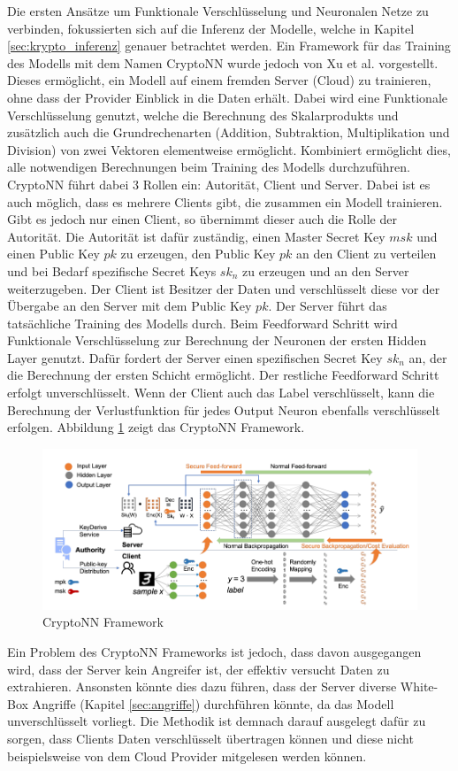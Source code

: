 Die ersten Ansätze um Funktionale Verschlüsselung und Neuronalen Netze zu verbinden, fokussierten sich auf die Inferenz der Modelle, welche in Kapitel \ref{sec:krypto_inferenz} genauer betrachtet werden.
Ein Framework für das Training des Modells mit dem Namen CryptoNN wurde jedoch von Xu et al. \cite{P-53} vorgestellt.
Dieses ermöglicht, ein Modell auf einem fremden Server (Cloud) zu trainieren, ohne dass der Provider Einblick in die Daten erhält.
Dabei wird eine Funktionale Verschlüsselung genutzt, welche die Berechnung des Skalarprodukts und zusätzlich auch die Grundrechenarten (Addition, Subtraktion, Multiplikation und Division) von zwei Vektoren elementweise ermöglicht.
Kombiniert ermöglicht dies, alle notwendigen Berechnungen beim Training des Modells durchzuführen.
CryptoNN führt dabei 3 Rollen ein: Autorität, Client und Server. 
Dabei ist es auch möglich, dass es mehrere Clients gibt, die zusammen ein Modell trainieren.
Gibt es jedoch nur einen Client, so übernimmt dieser auch die Rolle der Autorität.
Die Autorität ist dafür zuständig, einen Master Secret Key $msk$ und einen Public Key $pk$ zu erzeugen, den Public Key $pk$ an den Client zu verteilen und bei Bedarf spezifische Secret Keys $sk_n$ zu erzeugen und an den Server weiterzugeben.
Der Client ist Besitzer der Daten und verschlüsselt diese vor der Übergabe an den Server mit dem Public Key $pk$. 
Der Server führt das tatsächliche Training des Modells durch.
Beim Feedforward Schritt wird Funktionale Verschlüsselung zur Berechnung der Neuronen der ersten Hidden Layer genutzt.
Dafür fordert der Server einen spezifischen Secret Key $sk_n$ an, der die Berechnung der ersten Schicht ermöglicht.
Der restliche Feedforward Schritt erfolgt unverschlüsselt.
Wenn der Client auch das Label verschlüsselt, kann die Berechnung der Verlustfunktion für jedes Output Neuron ebenfalls verschlüsselt erfolgen.
Abbildung \ref{fig:cryptonn} zeigt das CryptoNN Framework.

\begin{figure}[!htb]
    \centering
    \includegraphics[width=15cm]{figures/cryptoNN}
    \caption{CryptoNN Framework \cite{P-53}}
    \label{fig:cryptonn}
\end{figure} 

Ein Problem des CryptoNN Frameworks ist jedoch, dass davon ausgegangen wird, dass der Server kein Angreifer ist, der effektiv versucht Daten zu extrahieren.
Ansonsten könnte dies dazu führen, dass der Server diverse White-Box Angriffe (Kapitel \ref{sec:angriffe}) durchführen könnte, da das Modell unverschlüsselt vorliegt.
Die Methodik ist demnach darauf ausgelegt dafür zu sorgen, dass Clients Daten verschlüsselt übertragen können und diese nicht beispielsweise von dem Cloud Provider mitgelesen werden können.

